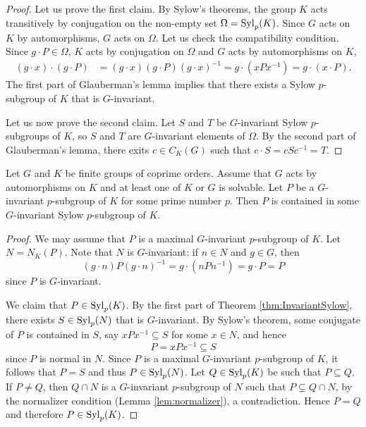\begin{proof}
	Let us prove the first claim. By Sylow's theorems, the group $K$ acts transitively by conjugation
	on the non-empty set 
	$\Omega=\mathrm{Syl}_p(K)$. Since $G$ acts on $K$ by automorphisms, $G$ acts on $\Omega$. Let us check the
	compatibility condition. Since $g\cdot P\in\Omega$, $K$ acts by conjugation
	on $\Omega$ and $G$ acts by automorphisms on $K$, 
	\begin{align*}
	(g\cdot x)\cdot (g\cdot P) &= (g\cdot x)(g\cdot P)(g\cdot x)^{-1}
	=g\cdot (xPx^{-1})=g\cdot (x\cdot P).
	\end{align*}
	The first part of Glauberman's lemma implies that there exists a Sylow $p$-subgroup 
	of $K$ that is $G$-invariant. 
	
	Let us now prove the second claim. 
	Let $S$ and $T$ be $G$-invariant Sylow $p$-subgroups of $K$, so $S$ and $T$ are $G$-invariant elements of $\Omega$. 
	By the second part of Glauberman's lemma, 
	there exits $c\in C_K(G)$ such that $c\cdot S=cSc^{-1}=T$. 
\end{proof}

\begin{corollary}
	 Let $G$ and $K$ be finite groups of coprime orders. Assume that $G$ acts by automorphisms on $K$ and 
	at least one of $K$ or $G$ is solvable. Let $P$ be a $G$-invariant $p$-subgroup 
	of $K$ for some prime number $p$. Then $P$ is contained in some $G$-invariant Sylow $p$-subgroup of $K$.  
\end{corollary}

\begin{proof}
	We may assume that $P$ is a maximal $G$-invariant $p$-subgroup of $K$. Let $N=N_K(P)$. Note that $N$ is $G$-invariant: if $n\in N$ and $g\in G$, then
	\[
	(g\cdot n)P(g\cdot n)^{-1}=g\cdot (nPn^{-1})=g\cdot P=P
	\]	
	since $P$ is $G$-invariant. 
	
	We claim that $P\in\mathrm{Syl}_p(K)$. By the first part of Theorem \ref{thm:InvariantSylow}, there exists 
	$S\in\mathrm{Syl}_p(N)$ that is $G$-invariant. By Sylow's theorem, 
	some conjugate of $P$ is contained in $S$, say $xPx^{-1}\subseteq S$ for some $x\in N$, and hence
	\[
	P=xPx^{-1}\subseteq S
	\]
	since $P$ is normal in $N$. Since $P$ is a maximal $G$-invariant $p$-subgroup of $K$, it follows that $P=S$ 
	and thus $P\in\mathrm{Syl}_p(N)$.   
	Let $Q\in\mathrm{Syl}_p(K)$ be such that $P\subseteq Q$. If $P\ne Q$, then   
	$Q\cap N$ is a $G$-invariant $p$-subgroup of $N$ such that $P\subsetneq Q\cap N$,  by the normalizer condition (Lemma \ref{lem:normalizer}), a contradiction. 
	Hence $P=Q$ and therefore
	$P\in\mathrm{Syl}_p(K)$.
\end{proof}

